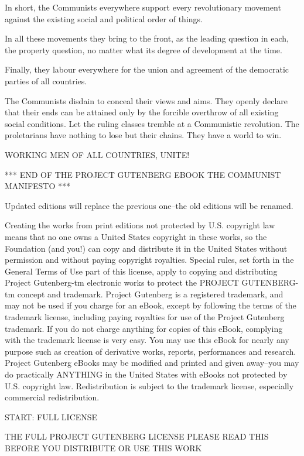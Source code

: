 In short, the Communists everywhere support every revolutionary
movement against the existing social and political order of things.

In all these movements they bring to the front, as the leading question
in each, the property question, no matter what its degree of
development at the time.

Finally, they labour everywhere for the union and agreement of the
democratic parties of all countries.

The Communists disdain to conceal their views and aims. They openly
declare that their ends can be attained only by the forcible overthrow
of all existing social conditions. Let the ruling classes tremble at a
Communistic revolution. The proletarians have nothing to lose but their
chains. They have a world to win.

WORKING MEN OF ALL COUNTRIES, UNITE!




*** END OF THE PROJECT GUTENBERG EBOOK THE COMMUNIST MANIFESTO ***

Updated editions will replace the previous one--the old editions will
be renamed.

Creating the works from print editions not protected by U.S. copyright
law means that no one owns a United States copyright in these works,
so the Foundation (and you!) can copy and distribute it in the
United States without permission and without paying copyright
royalties. Special rules, set forth in the General Terms of Use part
of this license, apply to copying and distributing Project
Gutenberg-tm electronic works to protect the PROJECT GUTENBERG-tm
concept and trademark. Project Gutenberg is a registered trademark,
and may not be used if you charge for an eBook, except by following
the terms of the trademark license, including paying royalties for use
of the Project Gutenberg trademark. If you do not charge anything for
copies of this eBook, complying with the trademark license is very
easy. You may use this eBook for nearly any purpose such as creation
of derivative works, reports, performances and research. Project
Gutenberg eBooks may be modified and printed and given away--you may
do practically ANYTHING in the United States with eBooks not protected
by U.S. copyright law. Redistribution is subject to the trademark
license, especially commercial redistribution.

START: FULL LICENSE

THE FULL PROJECT GUTENBERG LICENSE
PLEASE READ THIS BEFORE YOU DISTRIBUTE OR USE THIS WORK

